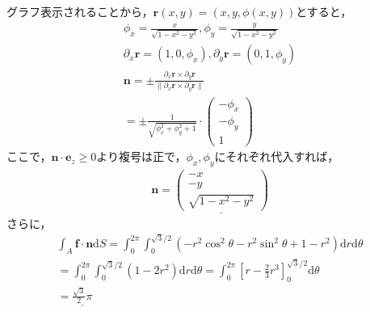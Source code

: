 \documentclass[dvipdfmx]{jsarticle}
\begin{document}
    \subsection{}
      グラフ表示されることから，$\bm{r}(x, y) = (x, y, \phi(x, y))$とすると，
      \begin{align*}
        \phi_x = \frac{x}{\sqrt{1 - x^2 - y^2}},
        \phi_y = \frac{y}{\sqrt{1 - x^2 - y^2}}\\
        \partial_x \bm{r} = (1, 0, \phi_x),
        \partial_y \bm{r} = (0, 1, \phi_y)\\
        \bm{n} = \pm \frac{\partial_x \bm{r} \times \partial_y \bm{r}}{\|\partial_x \bm{r} \times \partial_y \bm{r}\|}\\
        = \pm \frac{1}{\sqrt{\phi^2_x + \phi^2_y + 1}} \cdot 
        \begin{pmatrix}
          -\phi_x\\
          -\phi_y\\
          1
        \end{pmatrix}
      \end{align*}
      ここで，$\bm{n} \cdot \bm{e}_z \geq 0$より複号は正で，$\phi_x, \phi_y$にそれぞれ代入すれば，
      \begin{align*}
        \bm{n} =\underline{\begin{pmatrix} -x\\ -y\\ \sqrt{1-x^2-y^2} \end{pmatrix}}
      \end{align*}
      さらに，
      \begin{align*}
        \int_{A} \bm{f} \cdot \bm{n} \mathrm{d}S
        = \int_{0}^{2\pi}\int_{0}^{\sqrt{3}/2} (-r^2 \cos^2 \theta -r^2 \sin^2 \theta + 1 - r^2) \mathrm{d}r \mathrm{d}\theta\\
        = \int_{0}^{2\pi}\int_{0}^{\sqrt{3}/2} (1 - 2r^2) \mathrm{d}r \mathrm{d}\theta
        = \int_{0}^{2\pi} \left[r- \frac{2}{3} r^3\right]_{0}^{\sqrt{3}/2} \mathrm{d}\theta\\
        = \underline{\frac{\sqrt{3}}{2}\pi}
      \end{align*}
\end{document}
